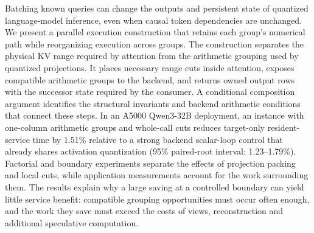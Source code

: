 Batching known queries can change the outputs and persistent state of quantized language-model inference, even when causal token dependencies are unchanged. We present a parallel execution construction that retains each group's numerical path while reorganizing execution across groups. The construction separates the physical KV range required by attention from the arithmetic grouping used by quantized projections. It places necessary range cuts inside attention, exposes compatible arithmetic groups to the backend, and returns owned output rows with the successor state required by the consumer. A conditional composition argument identifies the structural invariants and backend arithmetic conditions that connect these steps. In an A5000 Qwen3-32B deployment, an instance with one-column arithmetic groups and whole-call cuts reduces target-only resident-service time by 1.51\% relative to a strong backend scalar-loop control that already shares activation quantization (95\% paired-root interval: 1.23--1.79\%). Factorial and boundary experiments separate the effects of projection packing and local cuts, while application measurements account for the work surrounding them. The results explain why a large saving at a controlled boundary can yield little service benefit: compatible grouping opportunities must occur often enough, and the work they save must exceed the costs of views, reconstruction and additional speculative computation.
